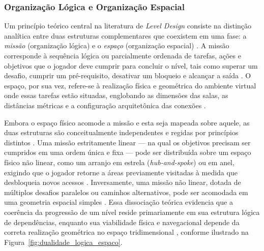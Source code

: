 \subsubsection{Organização Lógica e Organização Espacial}
\label{sec:organizacao_logica_espacial}

Um princípio teórico central na literatura de \textit{Level Design} consiste na distinção analítica entre duas estruturas complementares que coexistem em uma fase: a \textit{missão} (organização lógica) e o \textit{espaço} (organização espacial) \cite{dormans2010, linden2014dungeons}. A missão corresponde à sequência lógica ou parcialmente ordenada de tarefas, ações e objetivos que o jogador deve cumprir para concluir o nível, tais como superar um desafio, cumprir um pré-requisito, desativar um bloqueio e alcançar a saída \cite{dormans2010, linden2013designing}. O espaço, por sua vez, refere-se à realização física e geométrica do ambiente virtual onde essas tarefas estão situadas, englobando as dimensões das salas, as distâncias métricas e a configuração arquitetônica das conexões \cite{dormans2010, linden2014dungeons}.

Embora o espaço físico acomode a missão e esta seja mapeada sobre aquele, as duas estruturas são conceitualmente independentes e regidas por princípios distintos \cite{dormans2010}. Uma missão estritamente linear --- na qual os objetivos precisam ser cumpridos em uma ordem única e fixa --- pode ser distribuída sobre um espaço físico não linear, como um arranjo em estrela (\textit{hub-and-spoke}) ou em anel, exigindo que o jogador retorne a áreas previamente visitadas à medida que desbloqueia novos acessos \cite{dormans2010}. Inversamente, uma missão não linear, dotada de múltiplos desafios paralelos ou caminhos alternativos, pode ser acomodada em uma geometria espacial simples \cite{dormans2010, linden2013designing}. Essa dissociação teórica evidencia que a coerência da progressão de um nível reside primariamente em sua estrutura lógica de dependências, enquanto sua viabilidade física e navegacional depende da correta realização geométrica no espaço tridimensional \cite{dormans2010, linden2013designing, linden2014dungeons}, conforme ilustrado na Figura~\ref{fig:dualidade_logica_espaco}.

